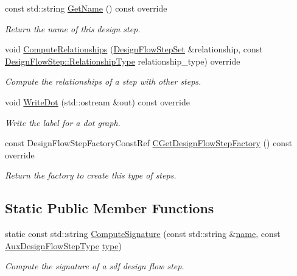 \begin{DoxyCompactItemize}
const std\+::string \hyperlink{classAuxDesignFlowStep_aada604a4981c38194ce791b2232e782c}{Get\+Name} () const override
\begin{DoxyCompactList}\small\item\em Return the name of this design step. \end{DoxyCompactList}\item 
void \hyperlink{classAuxDesignFlowStep_a1524f4638ebc58e0d345bfec52c27e54}{Compute\+Relationships} (\hyperlink{classDesignFlowStepSet}{Design\+Flow\+Step\+Set} \&relationship, const \hyperlink{classDesignFlowStep_a723a3baf19ff2ceb77bc13e099d0b1b7}{Design\+Flow\+Step\+::\+Relationship\+Type} relationship\+\_\+type) override
\begin{DoxyCompactList}\small\item\em Compute the relationships of a step with other steps. \end{DoxyCompactList}\item 
void \hyperlink{classAuxDesignFlowStep_acb3ca20dd02fa5e910b22c19a4d5f9c6}{Write\+Dot} (std\+::ostream \&out) const override
\begin{DoxyCompactList}\small\item\em Write the label for a dot graph. \end{DoxyCompactList}\item 
const Design\+Flow\+Step\+Factory\+Const\+Ref \hyperlink{classAuxDesignFlowStep_a062a1d93bb92d8df06c9cbf6340573ae}{C\+Get\+Design\+Flow\+Step\+Factory} () const override
\begin{DoxyCompactList}\small\item\em Return the factory to create this type of steps. \end{DoxyCompactList}\end{DoxyCompactItemize}
\subsection*{Static Public Member Functions}
\begin{DoxyCompactItemize}
\item 
static const std\+::string \hyperlink{classAuxDesignFlowStep_a2bc08e75088f339b9ed846ce917503f7}{Compute\+Signature} (const std\+::string \&\hyperlink{classAuxDesignFlowStep_af8d85f43fd8f5fad0e80d45dcb43105c}{name}, const \hyperlink{design__flow__aux__step_8hpp_a11050839fc7a6c59f7ec7eb2d1f1568b}{Aux\+Design\+Flow\+Step\+Type} \hyperlink{classAuxDesignFlowStep_abd729d912bc25066e2508f244b6eed8d}{type})
\begin{DoxyCompactList}\small\item\em Compute the signature of a sdf design flow step. \end{DoxyCompactList}\end{DoxyCompactItemize}
